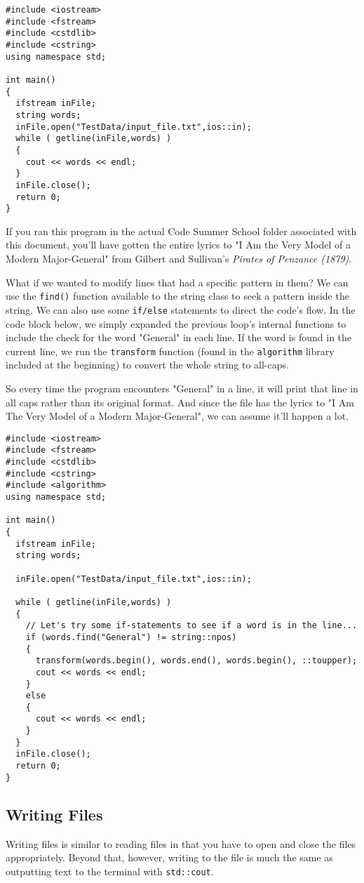 \begin{verbatim}
#include <iostream>
#include <fstream>
#include <cstdlib>
#include <cstring>
using namespace std;

int main()
{
  ifstream inFile;
  string words;
  inFile.open("TestData/input_file.txt",ios::in);
  while ( getline(inFile,words) )
  {
    cout << words << endl;
  }
  inFile.close();
  return 0;
}
\end{verbatim}

If you ran this program in the actual Code Summer School folder associated with this document, you'll have gotten the entire lyrics to "I Am the Very Model of a Modern Major-General" from Gilbert and Sullivan's \textit{Pirates of Penzance (1879)}.

What if we wanted to modify lines that had a specific pattern in them?
We can use the \texttt{find()} function available to the string class to seek a pattern inside the string.  We can also use some \texttt{if/else} statements to direct the code's flow.  In the code block below, we simply expanded the previous loop's internal functions to include the check for the word "General" in each line.  If the word is found in the current line, we run the \texttt{transform} function (found in the \texttt{algorithm} library included at the beginning) to convert the whole string to all-caps.

So every time the program encounters "General" in a line, it will print that line in all caps rather than its original format.  And since the file has the lyrics to "I Am The Very Model of a Modern Major-General", we can assume it'll happen a lot.

\begin{verbatim}
#include <iostream>
#include <fstream>
#include <cstdlib>
#include <cstring>
#include <algorithm>
using namespace std;

int main()
{
  ifstream inFile;
  string words;
  
  inFile.open("TestData/input_file.txt",ios::in);

  while ( getline(inFile,words) )
  {
    // Let's try some if-statements to see if a word is in the line...
    if (words.find("General") != string::npos)
    {
      transform(words.begin(), words.end(), words.begin(), ::toupper);
      cout << words << endl;
    }
    else
    {
      cout << words << endl;
    }
  }
  inFile.close();
  return 0;
}
\end{verbatim}

\subsection{Writing Files}
Writing files is similar to reading files in that you have to open and close the files appropriately.  Beyond that, however, writing to the file is much the same as outputting text to the terminal with \texttt{std::cout}.

